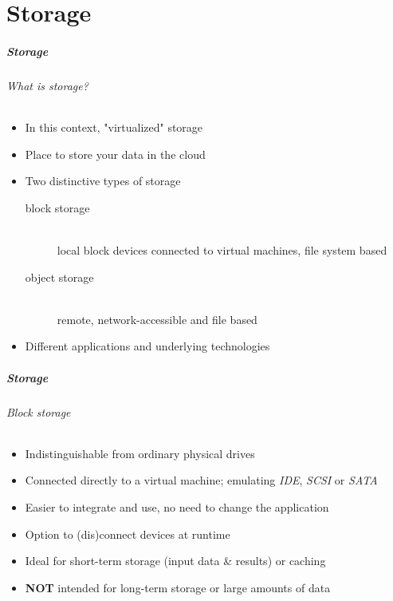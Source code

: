 \label{part_storage}
\part{Storage}

\begin{frame}
  \frametitle{Storage}
  \framesubtitle{What is storage?}

  \begin{itemize}
    \item In this context, "virtualized" storage
    \item Place to store your data in the cloud
    \item Two distinctive types of storage
      \begin{description}
        \item[block storage] \hfill\\
            local block devices connected to
            virtual machines, file system based
        \item[object storage] \hfill\\
            remote, network-accessible and file based
      \end{description}
    \item Different applications and underlying technologies
  \end{itemize}
\end{frame}

\begin{frame}
  \frametitle{Storage}
  \framesubtitle{Block storage}

  \begin{itemize}
    \item Indistinguishable from ordinary physical drives
    \item Connected directly to a virtual machine; emulating \textit{IDE},
          \textit{SCSI} or \textit{SATA}
    \item Easier to integrate and use, no need to change the application
    \item Option to (dis)connect devices at runtime
    \item Ideal for short-term storage (input data \& results) or caching
    \item \textbf{NOT} intended for long-term storage or large
          amounts of data
  \end{itemize}
\end{frame}

